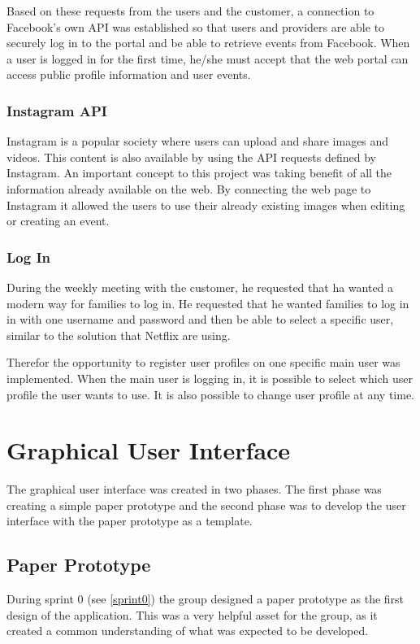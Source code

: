 Based on these requests from the users and the customer, a connection to Facebook's own API was established so that users and providers are able to securely log in to the portal and be able to retrieve events from Facebook. When a user is logged in for the first time, he/she must accept that the web portal can access public profile information and user events.

\subsubsection{Instagram API}
Instagram is a popular society where users can upload and share images and videos. This content is also available by using the API requests defined by Instagram.
An important concept to this project was taking benefit of all the information already available on the web. By connecting the web page to Instagram it allowed the users to use their already existing images when editing or creating an event. 

\subsubsection{Log In}
During the weekly meeting with the customer, he requested that ha wanted a modern way for families to log in. He requested that he wanted families to log in in with one username and password and then be able to select a specific user, similar to the solution that Netflix are using. 

Therefor the opportunity to register user profiles on one specific main user was implemented. When the main user is logging in, it is possible to select which user profile the user wants to use. It is also possible to change user profile at any time.

\section{Graphical User Interface}
The graphical user interface was created in two phases. The first phase was creating a simple paper prototype and the second phase was to develop the user interface with the paper prototype as a template.  

\subsection{Paper Prototype}
During sprint 0 (see \ref{sprint0}) the group designed a paper prototype as the first design of the application. This was a very helpful asset for the group, as it created a common understanding of what was expected to be developed.  

